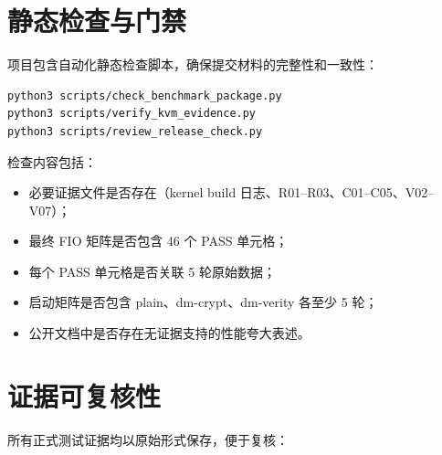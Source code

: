 \section{静态检查与门禁}

项目包含自动化静态检查脚本，确保提交材料的完整性和一致性：

\begin{lstlisting}[basicstyle=\ttfamily\small, breaklines=true]
python3 scripts/check_benchmark_package.py
python3 scripts/verify_kvm_evidence.py
python3 scripts/review_release_check.py
\end{lstlisting}

检查内容包括：
\begin{itemize}
    \item 必要证据文件是否存在（kernel build 日志、R01--R03、C01--C05、V02--V07）；
    \item 最终 FIO 矩阵是否包含 46 个 PASS 单元格；
    \item 每个 PASS 单元格是否关联 5 轮原始数据；
    \item 启动矩阵是否包含 plain、dm-crypt、dm-verity 各至少 5 轮；
    \item 公开文档中是否存在无证据支持的性能夸大表述。
\end{itemize}

\section{证据可复核性}

所有正式测试证据均以原始形式保存，便于复核：

